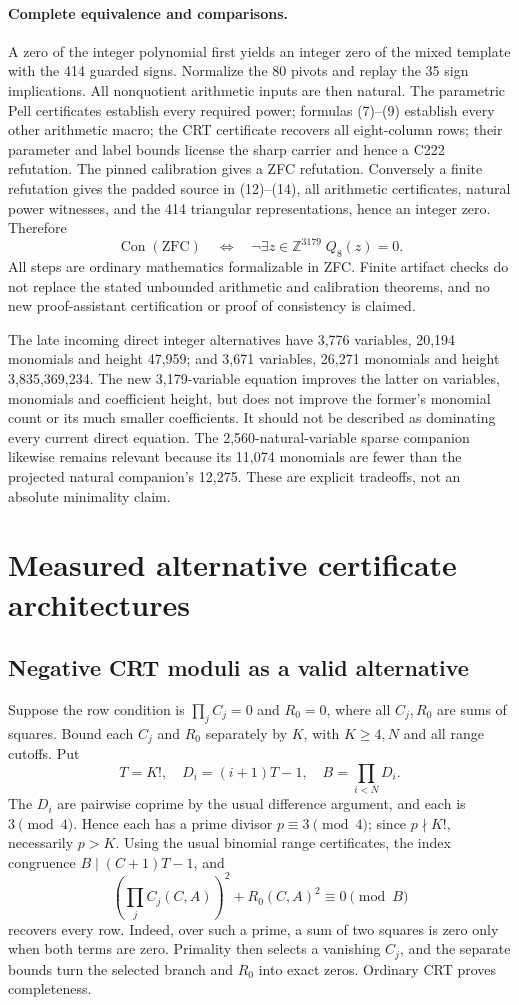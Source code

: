 \documentclass[11pt]{article}
\begin{document}
\paragraph{Complete equivalence and comparisons.}
A zero of the integer polynomial first yields an integer zero of the
mixed template with the 414 guarded signs.  Normalize the 80 pivots and
replay the 35 sign implications.  All nonquotient arithmetic inputs are
then natural.  The parametric Pell certificates establish every required
power; formulas (7)--(9) establish every other arithmetic macro; the CRT
certificate recovers all eight-column rows; their parameter and label
bounds license the sharp carrier and hence a C222 refutation.  The pinned
calibration gives a ZFC refutation.  Conversely a finite refutation gives
the padded source in (12)--(14), all arithmetic certificates, natural
power witnesses, and the 414 triangular representations, hence an integer
zero.  Therefore
\[
 \operatorname{Con}(\mathrm{ZFC})
 \quad\Longleftrightarrow\quad
 \neg\exists z\in\mathbb Z^{3179}\;Q_8(z)=0.
\]
All steps are ordinary mathematics formalizable in ZFC.  Finite artifact
checks do not replace the stated unbounded arithmetic and calibration
theorems, and no new proof-assistant certification or proof of consistency
is claimed.

The late incoming direct integer alternatives have 3,776 variables,
20,194 monomials and height 47,959; and 3,671 variables, 26,271 monomials
and height 3,835,369,234.  The new 3,179-variable equation improves the
latter on variables, monomials and coefficient height, but does not
improve the former's monomial count or its much smaller coefficients.
It should not be described as dominating every current direct equation.
The 2,560-natural-variable sparse companion likewise remains relevant
because its 11,074 monomials are fewer than the projected natural
companion's 12,275.  These are explicit tradeoffs, not an absolute
minimality claim.

\section{Measured alternative certificate architectures}
\subsection{Negative CRT moduli as a valid alternative}

Suppose the row condition is $\prod_j C_j=0$ and $R_0=0$, where all
$C_j,R_0$ are sums of squares. Bound each $C_j$ and $R_0$ separately
by $K$, with $K\ge4,N$ and all range cutoffs. Put
\[
 T=K!,\quad D_i=(i+1)T-1,\quad B=\prod_{i<N}D_i.
\]
The $D_i$ are pairwise coprime by the usual difference argument, and each
is $3\pmod4$. Hence each has a prime divisor $p\equiv3\pmod4$;
since $p\nmid K!$, necessarily $p>K$.
Using the usual binomial range certificates, the index congruence
$B\mid(C+1)T-1$, and
\[
 \left(\prod_jC_j(C,A)\right)^2+R_0(C,A)^2\equiv0\pmod B
\]
recovers every row. Indeed, over such a prime, a sum of two squares is
zero only when both terms are zero. Primality then selects a vanishing
$C_j$, and the separate bounds turn the selected branch and $R_0$ into
exact zeros. Ordinary CRT proves completeness.
\end{document}
